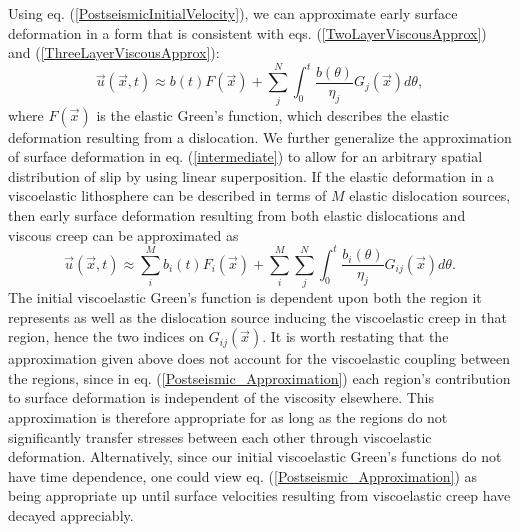 Using eq. (\ref{PostseismicInitialVelocity}), we can approximate
early surface deformation in a form that is consistent with
eqs. (\ref{TwoLayerViscousApprox}) and
(\ref{ThreeLayerViscousApprox}):
\begin{equation}\label{intermediate}
\vec{u}(\vec{x},t) \approx b(t)F(\vec{x}) + \sum_j^N\int_0^t
\frac{b(\theta)}{\eta_j}G_j(\vec{x}) d\theta,
\end{equation}
where $F(\vec{x})$ is the elastic Green's function, which describes the
elastic deformation resulting from a dislocation.  We further
generalize the approximation of surface deformation in
eq. (\ref{intermediate}) to allow for an arbitrary spatial
distribution of slip by using linear superposition.  If the elastic
deformation in a viscoelastic lithosphere can be described in terms of
$M$ elastic dislocation sources, then early surface deformation
resulting from both elastic dislocations and viscous creep can be
approximated as 
\begin{equation}\label{Postseismic_Approximation}
\vec{u}(\vec{x},t) \approx \sum_i^Mb_i(t)F_i(\vec{x}) +
\sum_i^M\sum_j^N\int_0^t\frac{b_i(\theta)}{\eta_j}G_{ij}(\vec{x}) d\theta.
\end{equation}
The initial viscoelastic Green's function is dependent upon both the
region it represents as well as the dislocation source inducing the
viscoelastic creep in that region, hence the two indices on
$G_{ij}(\vec{x})$.  It is worth restating that the approximation given
above does not account for the viscoelastic coupling between the
regions, since in eq. (\ref{Postseismic_Approximation}) each region's
contribution to surface deformation is independent of the viscosity
elsewhere.  This approximation is therefore appropriate for as long as
the regions do not significantly transfer stresses between each other
through viscoelastic deformation.  Alternatively, since our initial
viscoelastic Green's functions do not have time dependence, one could
view eq. (\ref{Postseismic_Approximation}) as being appropriate up
until surface velocities resulting from viscoelastic creep have
decayed appreciably.

